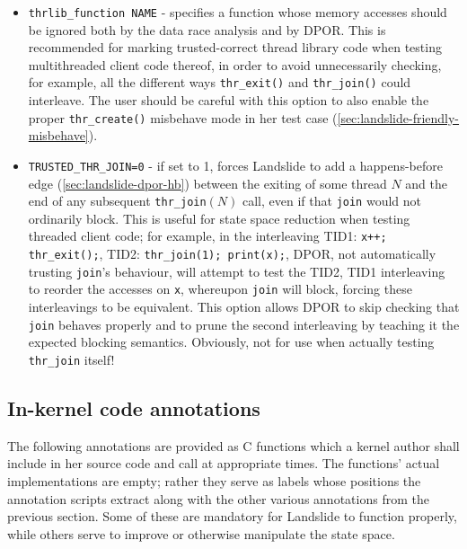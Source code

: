 \begin{itemize}
		{\tt USERSPACE} should be 0 or 1 to denote a kernel-space or user-space function respectively.
	\item {\tt thrlib\_function NAME} - specifies a function whose memory accesses should be ignored both by the data race analysis and by DPOR.
		This is recommended for marking trusted-correct thread library code when testing multithreaded client code thereof,
		in order to avoid unnecessarily checking, for example,
		all the different ways {\tt thr\_exit()} and {\tt thr\_join()} could interleave.
		The user should be careful with this option to also enable the proper {\tt thr\_create()} misbehave mode
		in her test case (\cref{sec:landslide-friendly-misbehave}).
	\item {\tt TRUSTED\_THR\_JOIN=0} - if set to 1, forces Landslide to add a happens-before edge (\cref{sec:landslide-dpor-hb}) between the exiting of some thread $N$ and the end of any subsequent {\tt thr\_join}$(N)$ call,
		even if that {\tt join} would not ordinarily block.
		This is useful for state space reduction when testing threaded client code;
		for example,
		in the interleaving
		TID1: {\tt x++; thr\_exit();},
		TID2: {\tt thr\_join(1); print(x);},
		DPOR, not automatically trusting {\tt join}'s behaviour,
		will attempt to test the TID2, TID1 interleaving to reorder the accesses on {\tt x},
		whereupon {\tt join} will block, forcing these interleavings to be equivalent.
		This option allows DPOR to skip checking that {\tt join} behaves properly
		and to prune the second interleaving
		by teaching it the expected blocking semantics. %
		Obviously, not for use when actually testing {\tt thr\_join} itself!
\end{itemize}


\subsection{In-kernel code annotations}
\label{sec:tell-landslide}

The following annotations are provided as C functions
which a kernel author shall include in her source code and call at appropriate times.
The functions' actual implementations are empty;
rather they serve as labels whose positions the annotation scripts extract
along with the other various annotations from the previous section.
Some of these are mandatory for Landslide to function properly,
while others serve to improve or otherwise manipulate the state space.

